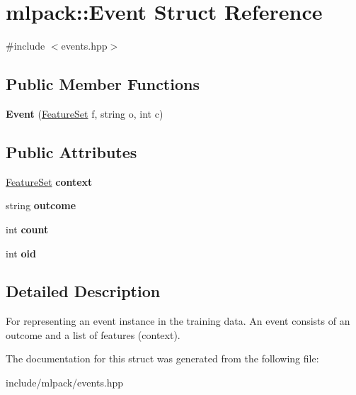 \hypertarget{structmlpack_1_1_event}{
\section{mlpack::Event Struct Reference}
\label{structmlpack_1_1_event}
}


{\ttfamily \#include $<$events.hpp$>$}

\subsection*{Public Member Functions}
\begin{DoxyCompactItemize}
\item 
\hypertarget{structmlpack_1_1_event_a59ebb3e8400d4849b8397b346ea4dee3}{
{\bfseries Event} (\hyperlink{structmlpack_1_1_feature_set}{FeatureSet} f, string o, int c)}
\label{structmlpack_1_1_event_a59ebb3e8400d4849b8397b346ea4dee3}

\end{DoxyCompactItemize}
\subsection*{Public Attributes}
\begin{DoxyCompactItemize}
\item 
\hypertarget{structmlpack_1_1_event_a755f573108dc50b1124cfba4c2a2c96c}{
\hyperlink{structmlpack_1_1_feature_set}{FeatureSet} {\bfseries context}}
\label{structmlpack_1_1_event_a755f573108dc50b1124cfba4c2a2c96c}

\item 
\hypertarget{structmlpack_1_1_event_a9f4cfe705671f5dfbe787a5dd2df4c24}{
string {\bfseries outcome}}
\label{structmlpack_1_1_event_a9f4cfe705671f5dfbe787a5dd2df4c24}

\item 
\hypertarget{structmlpack_1_1_event_ab33c2416b182e31f40f1be1542be9f74}{
int {\bfseries count}}
\label{structmlpack_1_1_event_ab33c2416b182e31f40f1be1542be9f74}

\item 
\hypertarget{structmlpack_1_1_event_ad81581cf10f9f431e062d98ee1239d33}{
int {\bfseries oid}}
\label{structmlpack_1_1_event_ad81581cf10f9f431e062d98ee1239d33}

\end{DoxyCompactItemize}


\subsection{Detailed Description}
For representing an event instance in the training data. An event consists of an outcome and a list of features (context). 

The documentation for this struct was generated from the following file:\begin{DoxyCompactItemize}
\item 
include/mlpack/events.hpp\end{DoxyCompactItemize}
